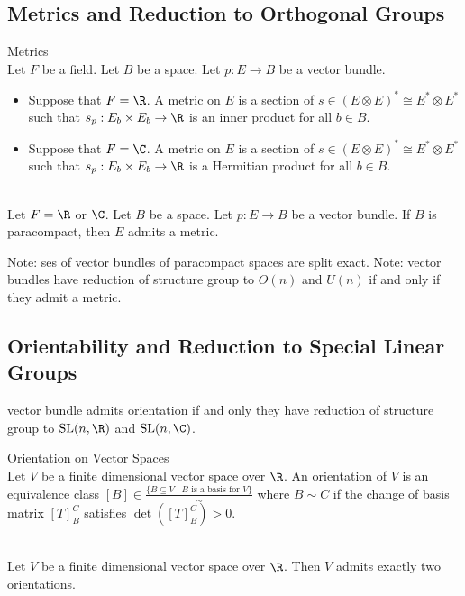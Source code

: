 \documentclass[a4paper]{article}
\begin{document}
\subsection{Metrics and Reduction to Orthogonal Groups}
\begin{defn}{Metrics}{}\\
Let $F$ be a field. Let $B$ be a space. Let $p:E\to B$ be a vector bundle. 
\begin{itemize}
\item Suppose that $F=\R$. A metric on $E$ is a section of $s\in(E\otimes E)^\ast\cong E^\ast\otimes E^\ast$ such that $s_p:E_b\times E_b\to\R$ is an inner product for all $b\in B$. 
\item Suppose that $F=\C$. A metric on $E$ is a section of $s\in(E\otimes E)^\ast\cong E^\ast\otimes E^\ast$ such that $s_p:E_b\times E_b\to\R$ is a Hermitian product for all $b\in B$. 
\end{itemize}
\end{defn}

\begin{lmm}{}{}\\
Let $F=\R$ or $\C$. Let $B$ be a space. Let $p:E\to B$ be a vector bundle. If $B$ is paracompact, then $E$ admits a metric. 
\end{lmm}

Note: ses of vector bundles of paracompact spaces are split exact. 
Note: vector bundles have reduction of structure group to $O(n)$ and $U(n)$ if and only if they admit a metric. 

\subsection{Orientability and Reduction to Special Linear Groups}
vector bundle admits orientation if and only they have reduction of structure group to $\text{SL}(n,\R)$ and $\text{SL}(n,\C)$. 

\begin{defn}{Orientation on Vector Spaces}{}\\
Let $V$ be a finite dimensional vector space over $\R$. An orientation of $V$ is an equivalence class $[B]\in\frac{\{B\subseteq V\;|\;B\text{ is a basis for }V\}}{\sim}$ where $B\sim C$ if the change of basis matrix $[T]_B^C$ satisfies $\det([T]_B^C)>0$. 
\end{defn}

\begin{lmm}{}{}\\
Let $V$ be a finite dimensional vector space over $\R$. Then $V$ admits exactly two orientations. 
\end{lmm}
\end{document}
